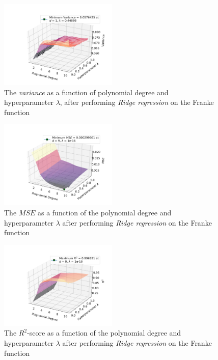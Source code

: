 \documentclass[a4paper,10pt,english]{article}
\begin{document}
\begin{multicols*}{2}
\begin{figure}[H]
	\centering 
	\includegraphics[width = 0.5\textwidth, center]{../franke_output/part_D_1.png}
	\caption{The \textit{variance} as a function of polynomial degree and hyperparameter $\lambda$, after performing \textit{Ridge regression} on the Franke function}
	\label{fig_8}
\end{figure}

\begin{figure}[H]
	\centering 
	\includegraphics[width = 0.5\textwidth, center]{../franke_output/part_D_2.png}
	\caption{The $MSE$ as a function of the polynomial degree and hyperparameter $\lambda$ after performing \textit{Ridge regression} on the Franke function}
	\label{fig_9}
\end{figure}

\begin{figure}[H]
	\centering 
	\includegraphics[width = 0.5\textwidth, center]{../franke_output/part_D_3.png}
	\caption{The $R^2$-score as a function of the polynomial degree and hyperparameter $\lambda$ after performing \textit{Ridge regression} on the Franke function}
	\label{fig_10}
\end{figure}


\end{multicols*}
\end{document}
